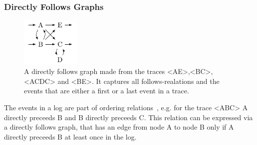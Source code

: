 \documentclass[
	a4paper,
	pagesize,
	pdftex,
	12pt,
	twoside, %
	BCOR=5mm, %
	ngerman,
	fleqn,
	final,
	]{scrartcl}
\begin{document}
\subsubsection{Directly Follows Graphs}
\begin{figure}
	\centering
	\includegraphics[width=0.25\textwidth]{img/dfgraphExample.pdf}
		\caption{A directly follows graph made from the traces <AE>,<BC>,<ACDC> and <BE>. It captures all follows-realations and the events that are either a first or a last event in a trace.}
		\label{fig:dfgraph}
\end{figure}
The events in a log are part of ordering relations~\cite{Relations}, e.g. for the trace <ABC> A directly preceeds B and B directly preceeds C. This relation can be expressed via a directly follows graph, that has an edge from node A to node B only if A directly preceeds B at least once in the log.
\end{document}
